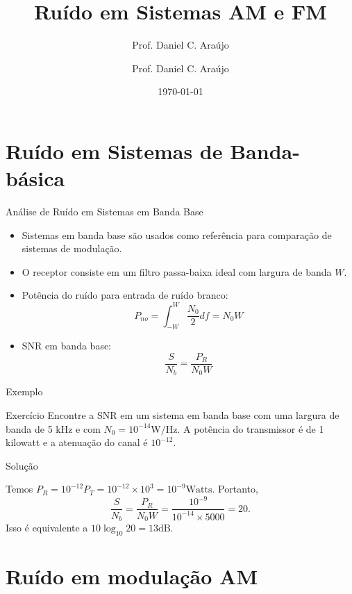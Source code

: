 \documentclass[aspectratio=169,dvipsnames]{beamer}
\subtitle{Prof. Daniel C. Araújo}
\date{\today}
\title{Ruído em Sistemas AM e FM}
\author{Prof. Daniel C. Araújo}
\institute{Universidade de Brasília}
\begin{document}
\frame{\titlepage}


\section{Ruído em Sistemas de Banda-básica}


\begin{frame}{Análise de Ruído em Sistemas em Banda Base}
\begin{itemize}
    \item Sistemas em banda base são usados como referência para comparação de sistemas de modulação.
    \item O receptor consiste em um filtro passa-baixa ideal com largura de banda \( W \).
    \item Potência do ruído para entrada de ruído branco:
    \begin{equation*}
        P_{no} = \int_{-W}^{W} \frac{N_0}{2}df = N_0W
    \end{equation*}
    \item SNR em banda base:
    \begin{equation*}
        \frac{S}{N_b} = \frac{P_R}{N_0W}
    \end{equation*}
\end{itemize}
\end{frame}

\begin{frame}{Exemplo}

\begin{block} {Exercício}
    Encontre a SNR em um sistema em banda base com uma largura de banda de 5 kHz e com \(N_0 = 10^{-14} \text{W/Hz}\). A potência do transmissor é de 1 kilowatt e a atenuação do canal é \(10^{-12}\).
\end{block}
\end{frame}



\begin{frame}{Solução}
\begin{block}{ }

    Temos \(P_R = 10^{-12} P_T = 10^{-12} \times 10^3 = 10^{-9} \text{Watts}\). Portanto,
\begin{equation*}
\frac{S}{N_b} = \frac{P_R}{N_0W} = \frac{10^{-9}}{10^{-14} \times 5000} = 20.
\end{equation*}
Isso é equivalente a \(10 \log_{10} 20 = 13 \text{dB}\).
\end{block}
\end{frame}


\section{Ruído em modulação AM}
\end{document}

